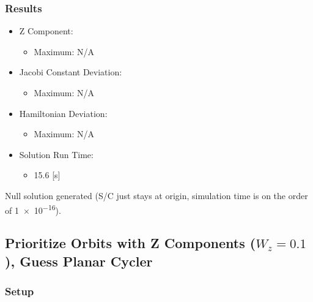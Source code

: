 \documentclass{article}
\begin{document}
\subsubsection{Results}

\begin{itemize}
    \item Z Component:
    \begin{itemize}
        \item Maximum: N/A
    \end{itemize}
    \item Jacobi Constant Deviation:
    \begin{itemize}
        \item Maximum: N/A
    \end{itemize}
    \item Hamiltonian Deviation:
    \begin{itemize}
        \item Maximum: N/A
    \end{itemize}
    \item Solution Run Time:
    \begin{itemize}
        \item 15.6 [s]
    \end{itemize}  
\end{itemize}

Null solution generated (S/C just stays at origin, simulation time is on the order of \num{1e-16}).

\newpage

\subsection{Prioritize Orbits with Z Components ($W_z = 0.1$), Guess Planar Cycler}

\subsubsection{Setup}
\end{document}
